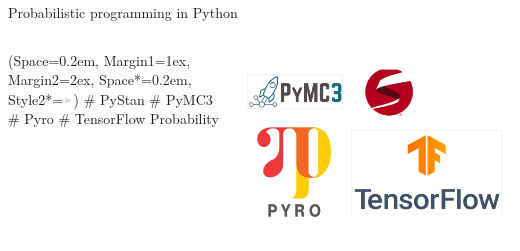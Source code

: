\documentclass[12pt, aspectratio=149]{beamer}
\newcommand{\listSpace}{0.2em}
\theoremstyle{plain}
\begin{document}
\begin{frame}[fragile]{Probabilistic programming in Python}
	\begin{columns}
		\begin{column}{0.5\linewidth}
			\begin{easylist}[itemize]
				\ListProperties(Space=\listSpace, Margin1=1ex, Margin2=2ex, Space*=\listSpace, Style2*=$\color{bggraydark}\blacktriangleright$\space)
				# PyStan
				# PyMC3
				# Pyro
				# TensorFlow Probability
			\end{easylist}
		\end{column}
		\begin{column}{0.5\textwidth}
			\includegraphics[width=\textwidth]{figs/logos.pdf}
		\end{column}
	\end{columns}
\end{frame}
\end{document}
